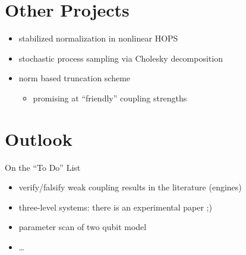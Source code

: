 \documentclass[10pt, aspectratio=169]{beamer}
\begin{document}
\section{Other Projects}
\begin{frame}[allowframebreaks]
  \begin{itemize}
  \item stabilized normalization in nonlinear HOPS
    \begin{figure}
      \centering
    \end{figure}
  \item stochastic process sampling via Cholesky decomposition
    \begin{figure}
      \centering
    \end{figure}
  \item norm based truncation scheme
    \begin{itemize}
    \item promising at ``friendly'' coupling strengths
    \end{itemize}
    \begin{figure}
      \centering
    \end{figure}
  \end{itemize}
\end{frame}



\section{Outlook}
\label{sec:outlook}
\begin{frame}{On the ``To Do'' List}
  \begin{itemize}
  \item verify/falsify weak coupling results in the literature
    (engines)
  \item three-level systems: there is an experimental paper ;)
  \item parameter scan of two qubit model
  \item \ldots
  \end{itemize}
\end{frame}
\end{document}
